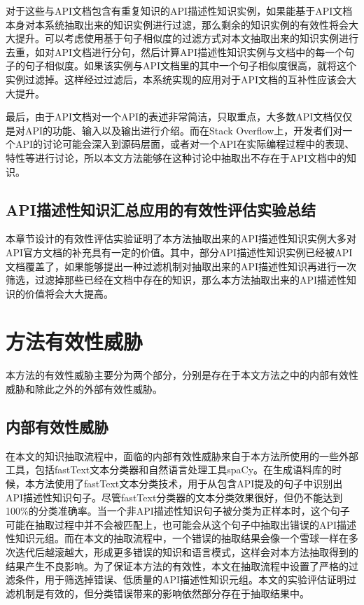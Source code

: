 对于这些与API文档包含有重复知识的API描述性知识实例，如果能基于API文档本身对本系统抽取出来的知识实例进行过滤，那么剩余的知识实例的有效性将会大大提升。可以考虑使用基于句子相似度的过滤方式对本文抽取出来的知识实例进行去重，如对API文档进行分句，然后计算API描述性知识实例与文档中的每一个句子的句子相似度。如果该实例与API文档里的其中一个句子相似度很高，就将这个实例过滤掉。这样经过过滤后，本系统实现的应用对于API文档的互补性应该会大大提升。

最后，由于API文档对一个API的表述非常简洁，只取重点，大多数API文档仅仅是对API的功能、输入以及输出进行介绍。而在Stack Overflow上，开发者们对一个API的讨论可能会深入到源码层面，或者对一个API在实际编程过程中的表现、特性等进行讨论，所以本文方法能够在这种讨论中抽取出不存在于API文档中的知识。

\subsection{API描述性知识汇总应用的有效性评估实验总结}
本章节设计的有效性评估实验证明了本方法抽取出来的API描述性知识实例大多对API官方文档的补充具有一定的价值。其中，部分API描述性知识实例已经被API文档覆盖了，如果能够提出一种过滤机制对抽取出来的API描述性知识再进行一次筛选，过滤掉那些已经在文档中存在的知识，那么本方法抽取出来的API描述性知识的价值将会大大提高。

\section{方法有效性威胁}
本方法的有效性威胁主要分为两个部分，分别是存在于本文方法之中的内部有效性威胁和除此之外的外部有效性威胁。

\subsection{内部有效性威胁}
在本文的知识抽取流程中，面临的内部有效性威胁来自于本方法所使用的一些外部工具，包括fastText文本分类器和自然语言处理工具spaCy。在生成语料库的时候，本方法使用了fastText文本分类技术，用于从包含API提及的句子中识别出API描述性知识句子。尽管fastText分类器的文本分类效果很好，但仍不能达到100\%的分类准确率。当一个非API描述性知识句子被分类为正样本时，这个句子可能在抽取过程中并不会被匹配上，也可能会从这个句子中抽取出错误的API描述性知识元组。而在本文的抽取流程中，一个错误的抽取结果会像一个雪球一样在多次迭代后越滚越大，形成更多错误的知识和语言模式，这样会对本方法抽取得到的结果产生不良影响。为了保证本方法的有效性，本文在抽取流程中设置了严格的过滤条件，用于筛选掉错误、低质量的API描述性知识元组。本文的实验评估证明过滤机制是有效的，但分类错误带来的影响依然部分存在于抽取结果中。

